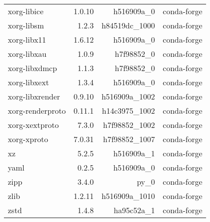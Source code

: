 \begin{table}
\begin{center}
\begin{tabular}{|l|r|r|l|}
			xorg-libice &1.0.10 & h516909a\_0 &conda-forge \\
			xorg-libsm &1.2.3 & h84519dc\_1000 &conda-forge \\
			xorg-libx11 &1.6.12 & h516909a\_0 &conda-forge \\
			xorg-libxau &1.0.9 & h7f98852\_0 &conda-forge \\
			xorg-libxdmcp &1.1.3 & h7f98852\_0 &conda-forge \\
			xorg-libxext &1.3.4 & h516909a\_0 &conda-forge \\
			xorg-libxrender &0.9.10 & h516909a\_1002 &conda-forge \\
			xorg-renderproto &0.11.1 & h14c3975\_1002 &conda-forge \\
			xorg-xextproto &7.3.0 & h7f98852\_1002 &conda-forge \\
			xorg-xproto &7.0.31 & h7f98852\_1007 &conda-forge \\
			xz &5.2.5 & h516909a\_1 &conda-forge \\
			yaml &0.2.5 & h516909a\_0 &conda-forge \\
			zipp &3.4.0 & py\_0 &conda-forge \\
			zlib &1.2.11 & h516909a\_1010 &conda-forge \\
			zstd &1.4.8 & ha95c52a\_1 &conda-forge \\
		\end{tabular}
	\end{center}
\end{table}			

